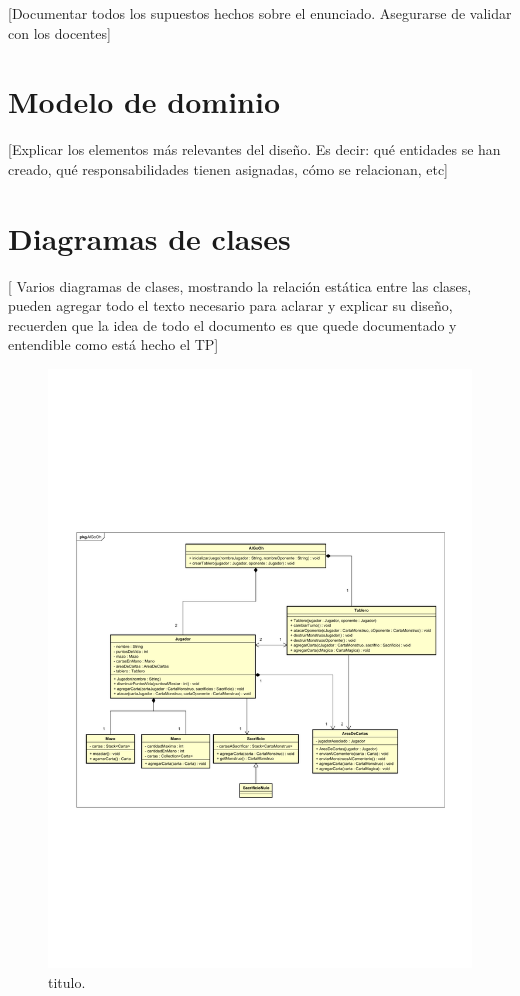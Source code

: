 [Documentar todos los supuestos hechos sobre el enunciado. Asegurarse
de validar con los docentes]

\section{Modelo de dominio}

[Explicar los elementos más relevantes del diseño. Es decir: qué
entidades se han creado, qué responsabilidades tienen asignadas, cómo
se relacionan, etc]

\clearpage
\section{Diagramas de clases}

[ Varios diagramas de clases, mostrando la relación estática entre las
clases, pueden agregar todo el texto necesario para aclarar y explicar su
diseño, recuerden que la idea de todo el documento es que quede
documentado y entendible como está hecho el TP]

\begin{figure}[H]
	\centering
	\includegraphics[scale=0.9]{includes/AlGoOh}
	\caption{titulo.}
	\label{AlGoOh}
\end{figure}

